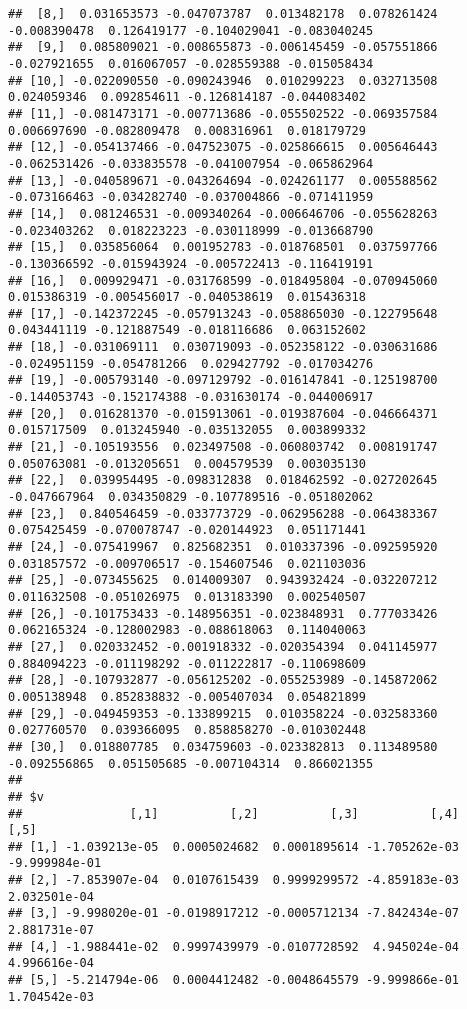 \documentclass[
]{book}
\begin{document}
\begin{verbatim}
##  [8,]  0.031653573 -0.047073787  0.013482178  0.078261424 -0.008390478  0.126419177 -0.104029041 -0.083040245
##  [9,]  0.085809021 -0.008655873 -0.006145459 -0.057551866 -0.027921655  0.016067057 -0.028559388 -0.015058434
## [10,] -0.022090550 -0.090243946  0.010299223  0.032713508  0.024059346  0.092854611 -0.126814187 -0.044083402
## [11,] -0.081473171 -0.007713686 -0.055502522 -0.069357584  0.006697690 -0.082809478  0.008316961  0.018179729
## [12,] -0.054137466 -0.047523075 -0.025866615  0.005646443 -0.062531426 -0.033835578 -0.041007954 -0.065862964
## [13,] -0.040589671 -0.043264694 -0.024261177  0.005588562 -0.073166463 -0.034282740 -0.037004866 -0.071411959
## [14,]  0.081246531 -0.009340264 -0.006646706 -0.055628263 -0.023403262  0.018223223 -0.030118999 -0.013668790
## [15,]  0.035856064  0.001952783 -0.018768501  0.037597766 -0.130366592 -0.015943924 -0.005722413 -0.116419191
## [16,]  0.009929471 -0.031768599 -0.018495804 -0.070945060  0.015386319 -0.005456017 -0.040538619  0.015436318
## [17,] -0.142372245 -0.057913243 -0.058865030 -0.122795648  0.043441119 -0.121887549 -0.018116686  0.063152602
## [18,] -0.031069111  0.030719093 -0.052358122 -0.030631686 -0.024951159 -0.054781266  0.029427792 -0.017034276
## [19,] -0.005793140 -0.097129792 -0.016147841 -0.125198700 -0.144053743 -0.152174388 -0.031630174 -0.044006917
## [20,]  0.016281370 -0.015913061 -0.019387604 -0.046664371  0.015717509  0.013245940 -0.035132055  0.003899332
## [21,] -0.105193556  0.023497508 -0.060803742  0.008191747  0.050763081 -0.013205651  0.004579539  0.003035130
## [22,]  0.039954495 -0.098312838  0.018462592 -0.027202645 -0.047667964  0.034350829 -0.107789516 -0.051802062
## [23,]  0.840546459 -0.033773729 -0.062956288 -0.064383367  0.075425459 -0.070078747 -0.020144923  0.051171441
## [24,] -0.075419967  0.825682351  0.010337396 -0.092595920  0.031857572 -0.009706517 -0.154607546  0.021103036
## [25,] -0.073455625  0.014009307  0.943932424 -0.032207212  0.011632508 -0.051026975  0.013183390  0.002540507
## [26,] -0.101753433 -0.148956351 -0.023848931  0.777033426  0.062165324 -0.128002983 -0.088618063  0.114040063
## [27,]  0.020332452 -0.001918332 -0.020354394  0.041145977  0.884094223 -0.011198292 -0.011222817 -0.110698609
## [28,] -0.107932877 -0.056125202 -0.055253989 -0.145872062  0.005138948  0.852838832 -0.005407034  0.054821899
## [29,] -0.049459353 -0.133899215  0.010358224 -0.032583360  0.027760570  0.039366095  0.858858270 -0.010302448
## [30,]  0.018807785  0.034759603 -0.023382813  0.113489580 -0.092556865  0.051505685 -0.007104314  0.866021355
## 
## $v
##               [,1]          [,2]          [,3]          [,4]          [,5]
## [1,] -1.039213e-05  0.0005024682  0.0001895614 -1.705262e-03 -9.999984e-01
## [2,] -7.853907e-04  0.0107615439  0.9999299572 -4.859183e-03  2.032501e-04
## [3,] -9.998020e-01 -0.0198917212 -0.0005712134 -7.842434e-07  2.881731e-07
## [4,] -1.988441e-02  0.9997439979 -0.0107728592  4.945024e-04  4.996616e-04
## [5,] -5.214794e-06  0.0004412482 -0.0048645579 -9.999866e-01  1.704542e-03
\end{verbatim}
\end{document}
